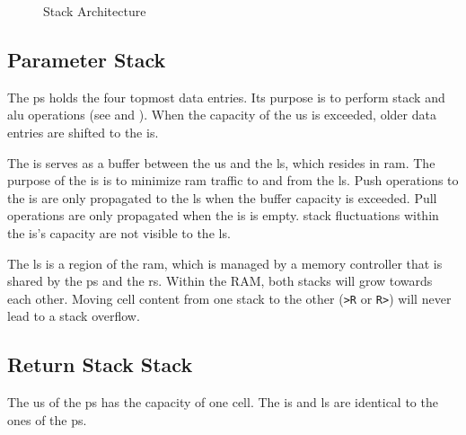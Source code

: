 \begin{figure}[!h]
\begin{center}
{{
    }
  }
  \caption{Stack Architecture}
  \label{stacks:fig}
  \end{center}
\end{figure}

\subsection{Parameter Stack}
\label{stacks:ps}

The  \gls{ps} holds the four topmost data entries.
Its purpose is to perform stack and \gls{alu} operations
(see  and ).
When the capacity of the \gls{us} is exceeded, older data entries are shifted
to the \gls{is}.

The \gls{is} serves as a buffer between the \gls{us} and the \gls{ls}, which resides
in \gls{ram}. The purpose of the \gls{is} is to minimize \gls{ram} traffic to and
from the \gls{ls}.
Push operations to the \gls{is} are only propagated to the \gls{ls} when the buffer
capacity is exceeded. Pull operations are only propagated when the \gls{is} is empty.
\Gls{stack} fluctuations within the \gls{is}'s capacity are not visible to the \gls{ls}.

The \gls{ls} is a region of the \gls{ram}, which is managed by a memory controller
that is shared by the \gls{ps} and the \gls{rs}. Within the RAM, both stacks will
grow towards each other. Moving cell content from one stack to the other (\texttt{>R} 
or \texttt{R>}) will never lead to a stack overflow. 

\subsection{Return Stack Stack}
\label{stacks:ps}

The \gls{us} of the \gls{ps} has the capacity of one \gls{cell}. The \gls{is} and
\gls{ls} are identical to the ones of the \gls{ps}.
